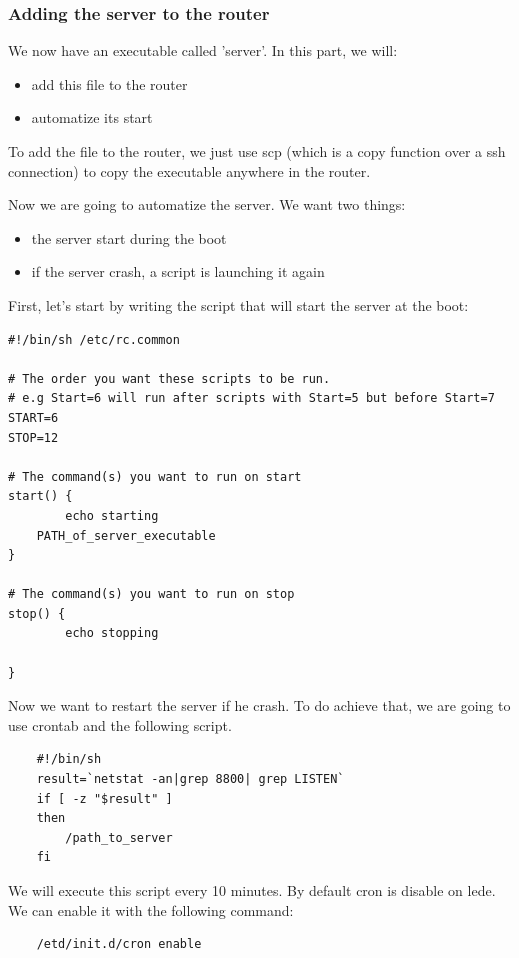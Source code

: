 \subsubsection{Adding the server to the router}

We now have an executable called 'server'. In this part, we will:
\begin{itemize}
	\item add this file to the router
	\item automatize its start
\end{itemize}



To add the file to the router, we just use scp (which is a copy function over a ssh connection) to copy the executable anywhere in the router.


Now we are going to automatize the server. We want two things:
\begin{itemize}
	\item the server start during the boot
	\item if the server crash, a script is launching it again
\end{itemize}

First, let's start by writing the script that will start the server at the boot:


\begin{lstlisting}
#!/bin/sh /etc/rc.common

# The order you want these scripts to be run. 
# e.g Start=6 will run after scripts with Start=5 but before Start=7
START=6
STOP=12

# The command(s) you want to run on start
start() {        
        echo starting
	PATH_of_server_executable
}                 

# The command(s) you want to run on stop
stop() {          
        echo stopping
				
}
\end{lstlisting}



Now we want to restart the server if he crash.
To do achieve that, we are going to use crontab and the following script.

\begin{lstlisting}
	#!/bin/sh
	result=`netstat -an|grep 8800| grep LISTEN`
	if [ -z "$result" ]
	then
		/path_to_server
	fi
\end{lstlisting}



We will execute this script every 10 minutes.
By default cron is disable on lede. We can enable it with the following command:
\begin{lstlisting}
	/etd/init.d/cron enable
\end{lstlisting}

